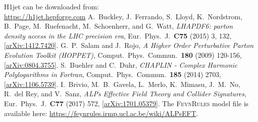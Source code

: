 \documentclass[12pt,a4wide]{article}
\begin{document}
\begin{thebibliography}{1}
    H1jet can be downloaded from: \\ \href{https://h1jet.hepforge.com}{https://h1jet.hepforge.com}
    A.\ Buckley, J.\ Ferrando, S.\ Lloyd, K.\ Nordstrom, B.\ Page, M.\ Ruefenacht, M.\ Schoenherr, and G.\ Watt, \textit{LHAPDF6: parton density access in the LHC precision era}, Eur.\ Phys.\ J.\ \textbf{C75} (2015) 3, 132, [\href{https://arxiv.org/abs/1412.7420}{arXiv:1412.7420}]. 
    G.\ P.\ Salam and J.\ Rojo, \textit{A Higher Order Perturbative Parton Evolution Toolkit (HOPPET)}, Comput.\ Phys.\ Commun.\ \textbf{180} (2009) 120-156, [\href{https://arxiv.org/abs/0804.3755}{arXiv:0804.3755}]. 
    S.\ Buehler and C.\ Duhr, \textit{CHAPLIN - Complex Harmonic Polylogarithms in Fortran}, Comput.\ Phys.\ Commun.\ \textbf{185} (2014) 2703, [\href{https://arxiv.org/abs/1106.5739}{arXiv:1106.5739}]. 
    I.\ Brivio, M.\ B.\ Gavela, L.\ Merlo, K.\ Mimasu, J.\ M.\ No, R.\ del Rey, and V.\ Sanz, \textit{ALPs Effective Field Theory and Collider Signatures}, Eur.\ Phys.\ J.\ \textbf{C77} (2017) 572, [\href{https://arxiv.org/abs/1701.05379}{arXiv:1701.05379}]. The \textsc{FeynRules} model file is available here: \href{https://feynrules.irmp.ucl.ac.be/wiki/ALPsEFT}{https://feynrules.irmp.ucl.ac.be/wiki/ALPsEFT}. 
\end{thebibliography}
\end{document}
